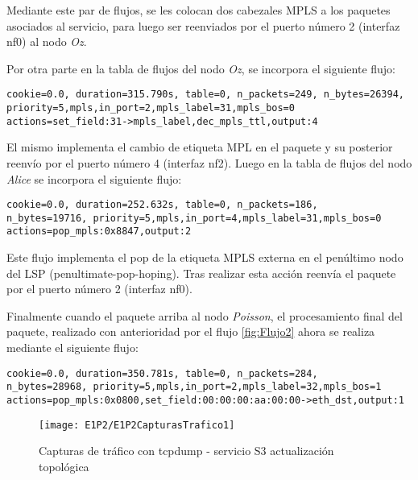 Mediante este par de flujos, se les colocan dos cabezales MPLS a los paquetes asociados al servicio, para luego ser reenviados por el puerto n\'umero 2 (interfaz nf0) al nodo \textit{Oz}. 

Por otra parte en la tabla de flujos del nodo \textit{Oz}, se incorpora el siguiente flujo:

\begin{center}
\texttt{cookie=0.0, duration=315.790s, table=0, n\_packets=249, n\_bytes=26394, \\
priority=5,mpls,in\_port=2,mpls\_label=31,mpls\_bos=0 \\
actions=set\_field:31->mpls\_label,dec\_mpls\_ttl,output:4 }
\end{center}

El mismo implementa el cambio de etiqueta MPL en el paquete y su posterior reenvío por el puerto n\'umero 4 (interfaz nf2). Luego en la tabla de flujos del nodo \textit{Alice} se incorpora el siguiente flujo:

\begin{center}
\texttt{cookie=0.0, duration=252.632s, table=0, n\_packets=186, \\
n\_bytes=19716, priority=5,mpls,in\_port=4,mpls\_label=31,mpls\_bos=0 \\
actions=pop\_mpls:0x8847,output:2 }
\end{center}

Este flujo implementa el pop de la etiqueta MPLS externa en el penúltimo nodo del LSP (penultimate-pop-hoping). Tras realizar esta acci\'on reenvía el paquete por el puerto n\'umero 2 (interfaz nf0).

Finalmente cuando el paquete arriba al nodo \textit{Poisson}, el procesamiento final del paquete, realizado con anterioridad por el flujo \ref{fig:Flujo2} ahora se realiza mediante el siguiente flujo: 

\begin{center}
\texttt{cookie=0.0, duration=350.781s, table=0, n\_packets=284, \\
n\_bytes=28968, priority=5,mpls,in\_port=2,mpls\_label=32,mpls\_bos=1 \\
actions=pop\_mpls:0x0800,set\_field:00:00:00:aa:00:00->eth\_dst,output:1 }
\end{center}

\begin{figure}[h!] 
\centering    
\texttt{[image: E1P2/E1P2CapturasTrafico1]}
\caption[Capturas de tr\'afico con tcpdump - servicio S3 actualización topol\'ogica]{Capturas de tr\'afico con tcpdump - servicio S3 actualización topol\'ogica}
\label{fig:LabE1P1CapsTraf3}
\end{figure}

